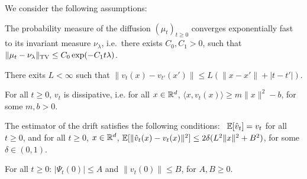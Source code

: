 We consider the following assumptions: \vspace{\minvsp pt}
\begin{assumption}
\label{asmp:sde_expconv}
The probability measure of the diffusion $(\mu_t)_{t\geq 0}$ converges exponentially fast to its invariant measure $\nu_\lambda$, i.e.\ there exists $C_0, C_1 >0$, such that
$\|\mu_t - \nu_\lambda \|_{\textnormal{TV}} \leq C_0 \exp(-C_1 t \lambda)$.
\vspace{\minvsp pt}
\end{assumption}
%
\begin{assumption}
\label{asmp:lipschitz}
There exits $L < \infty$ such that
$\| v_t(x) - v_{t'}(x') \| \leq L ( \|x-x' \| + |t-t'|)$.
\vspace{\minvsp pt}
\end{assumption}
%
\begin{assumption}
\label{asmp:dissip}
For all $t \geq 0$, $v_t$ is dissipative, i.e. for all $x \in \mathbb{R}^d$,
$\langle x, v_t(x) \rangle \geq m \|x\|^2 -b$,
for some $m,b >0$.
\vspace{\minvsp pt}
\end{assumption}
%
\begin{assumption}
\label{asmp:stochgrad}
The estimator of the drift satisfies the following conditions: \ $\mathbb{E}[\hat{v}_t] = v_t$ for all $t \geq 0$, and for all $t\geq 0$, $x \in \mathbb{R}^d$,
$\mathbb{E}[ \|\hat{v}_t(x) - v_t(x) \|^2] \leq 2 \delta(L^2 \|x\|^2 + B^2)$,
for some $\delta \in (0,1)$.
\vspace{\minvsp pt}
\end{assumption}
%
\begin{assumption}
\label{asmp:init_fun}
For all $t \geq 0$: $|\Psi_t(0)| \leq A$ and $\|v_t(0)\| \leq B$,
for $A,B \geq 0$.
\end{assumption}



